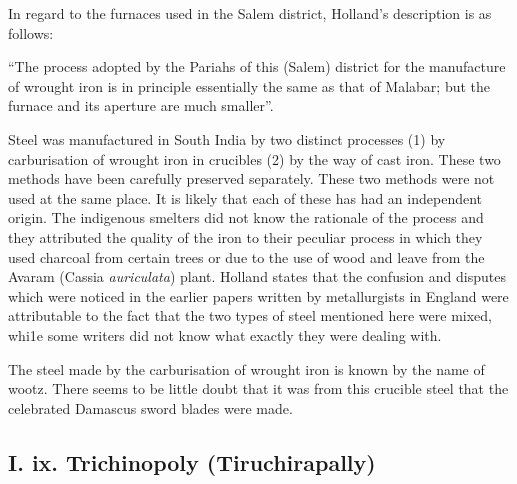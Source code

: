 In regard to the furnaces used in the Salem district, Holland’s description is as follows: 

“The process adopted by the Pariahs of this (Salem) district for the manufacture of wrought iron is in principle essentially the same as that of Malabar; but the furnace and its aperture are much smaller”. 

Steel was manufactured in South India by two distinct processes (1) by carburisation of wrought iron in crucibles (2) by the way of cast iron. These two methods have been carefully preserved separately. These two methods were not used at the same place. It is likely that each of these has had an independent origin. The indigenous smelters did not know the rationale of the process and they attributed the quality of the iron to their peculiar process in which they used charcoal from certain trees or due to the use of wood and leave from the Avaram (Cassia {\it auriculata}) plant. Holland states that the confusion and disputes which were noticed in the earlier papers written by metallurgists in England were attributable to the fact that the two types of steel mentioned here were mixed, whi1e some writers did not know what exactly they were dealing with.

The steel made by the carburisation of wrought iron is known by the name of wootz. There seems to be little doubt that it was from this crucible steel that the celebrated Damascus sword blades were made. 

\vspace{-.3cm}

\subsection*{I. ix. Trichinopoly (Tiruchirapally)}\label{subsection-9}

\vspace{-.2cm}

